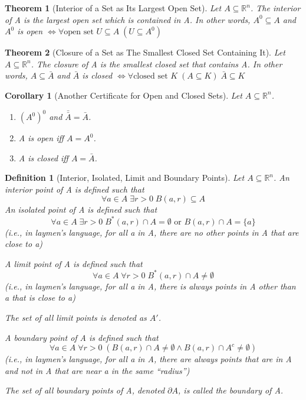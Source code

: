 \documentclass[11pt, oneside]{book}
\theoremstyle{break}
\newtheorem{thm}{Theorem}[section]
\newtheorem{crly}{Corollary}[thm]
\newtheorem{defn}{Definition}[section]
\newcommand{\bb}[1]{\mathbb{#1}}		%
\begin{document}
\begin{thm}[Interior of a Set as Its Largest Open Set]
	Let $A \subseteq \bb{R}^n$. The interior of A is the largest open set which is contained in A. In other words, $A^0 \subseteq A$ and $A^0$ is open $\iff \forall \text{open set } U \subseteq A \; (U \subseteq A^0)$
\end{thm}

\begin{thm}[Closure of a Set as The Smallest Closed Set Containing It]
	Let $A \subseteq \bb{R}^n$. The closure of A is the smallest closed set that contains A. In other words, $A \subseteq \bar{A}$ and $\bar{A}$ is closed $\iff \forall \text{closed set } K \; (A \subseteq K) \; \bar{A} \subseteq K$
\end{thm}

\begin{crly}[Another Certificate for Open and Closed Sets]
	Let $A \subseteq \bb{R}^n$.
	\begin{enumerate}
		\item $(A^0)^0$ and $\bar{\bar{A}} = \bar{A}$.
		\item A is open iff $A = A^0$.
		\item A is closed iff $A = \bar{A}$.
	\end{enumerate}
\end{crly}

\begin{defn}[Interior, Isolated, Limit and Boundary Points]
	Let $A \subseteq \bb{R}^n$. An interior point of A is defined such that
	\begin{equation*}
		\forall a \in A \; \exists r > 0 \; B(a, r) \subseteq A
	\end{equation*}
	An isolated point of A is defined such that
	\begin{equation*}
		\forall a \in A \; \exists r > 0 \; B^*(a,r) \cap A = \emptyset \text{ or } B(a,r) \cap A = \{a\}
	\end{equation*}
	(i.e., in laymen's language, for all a in A, there are no other points in A that are close to a)
	
	A limit point of A is defined such that
	\begin{equation*}
		\forall a \in A \; \forall r > 0 \; B^*(a,r) \cap A \neq \emptyset
	\end{equation*}
	(i.e., in laymen's language, for all a in A, there is always points in A other than a that is close to a)

	The set of all limit points is denoted as $A'$.
	
	A boundary point of A is defined such that
	\begin{equation*}
		\forall a \in A \; \forall r > 0 \; ( B(a,r) \cap A \neq \emptyset \land B(a,r) \cap A^c \neq \emptyset)
	\end{equation*}
	(i.e., in laymen's language, for all a in A, there are always points that are in A and not in A that are near a in the same ``radius'')

	The set of all boundary points of A, denoted $\partial A$, is called the boundary of A.
\end{defn}
\end{document}
